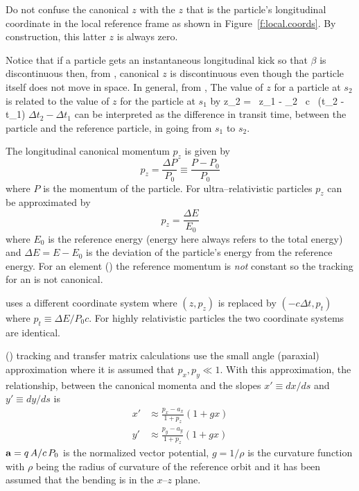 Do not confuse the canonical $z$ with the $z$ that is the particle's
longitudinal coordinate in the local reference frame as shown in
Figure~\ref{f:local.coords}. By construction, this latter $z$ is
always zero.

Notice that if a particle gets an instantaneous longitudinal kick so
that $\beta$ is discontinuous then, from , canonical $z$ is
discontinuous even though the particle itself does not move in
space. In general, from , The value of $z$ for a particle at
$s_2$ is related to the value of $z$ for the particle at $s_1$ by
\Begineq
  z_2 =  \, z_1 - 
  \beta_2 \, c \, (\Delta t_2 - \Delta t_1)
  \label{zbbzb}
\Endeq
$\Delta t_2 - \Delta t_1$ can be interpreted as the difference in
transit time, between the particle and the reference particle, in going
from $s_1$ to $s_2$.

The longitudinal canonical momentum $p_z$ is given by
\begin{equation}
  p_z = \frac{\Delta P}{P_0} \equiv \frac{P - P_0}{P_0}
\end{equation}
where $P$ is the momentum of the particle. For ultra--relativistic particles
$p_z$ can be approximated by
\begin{equation}
  p_z = \frac{\Delta E}{E_0}
\end{equation}
where $E_0$ is the reference energy (energy here always refers to the
total energy) and $\Delta E = E - E_0$ is the deviation of the
particle's energy from the reference energy. For an 
element () the reference momentum is {\it not} constant
so the tracking for an  is not canonical.


\mad uses a different coordinate system where $(z, p_z)$ is
replaced by $(-c\Delta t, p_t)$ where $p_t \equiv \Delta E / P_0
c$. For highly relativistic particles the two coordinate systems are
identical.

 () tracking and transfer matrix
calculations use the small angle (paraxial) approximation where it is
assumed that $p_x, p_y \ll 1$. With this approximation, the
relationship, between the canonical momenta and the slopes $x' \equiv
dx/ds$ and $y' \equiv dy/ds$ is
\begin{align}
  x' &\approx \frac{p_x - a_x}{1 + p_z} (1 + g x) \\
  y' &\approx \frac{p_y - a_y}{1 + p_z} (1 + g x) 
  \label{xpa1p}
\end{align}
${\bf a} = q \, A / c \, P_0$ is the normalized vector potential, $g =
1/\rho$ is the curvature function with $\rho$ being the radius of
curvature of the reference orbit and it has been assumed that the
bending is in the $x$--$z$ plane. 


